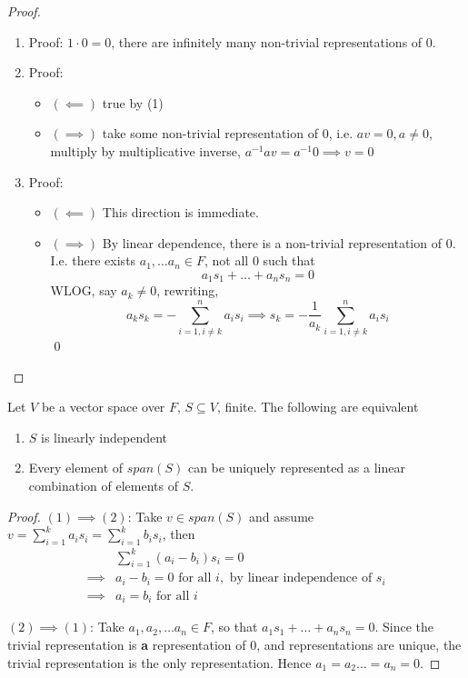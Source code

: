 \begin{proof}
\begin{enumerate}
  \item Proof: $1 \cdot 0 = 0$, there are infinitely many non-trivial representations of 0.
  \item Proof:
  \begin{itemize}
    \item $(\impliedby)$ true by (1)
    \item $(\implies)$ take some non-trivial representation of 0, i.e. $av = 0, a \neq 0$, multiply by multiplicative inverse, $a^{-1}a v = a^{-1}0 \implies v = 0$
  \end{itemize}
  \item Proof:
  \begin{itemize}
    \item $(\impliedby)$ This direction is immediate.
    \item $(\implies)$ By linear dependence, there is a non-trivial representation of 0. I.e. there exists $a_1, \hdots a_n \in F$, not all 0 such that 
    \[
      a_1 s_1 + \hdots + a_n s_n = 0
    \]
    WLOG, say $a_k \neq 0$, rewriting, 
    \[
      a_ks_k = - \sum_{i = 1, i \neq k}^n a_i s_i \implies s_k = - \frac{1}{a_k} \sum_{i = 1, i \neq k}^{n} a_i s_i
    \]
    \qed
  \end{itemize}
\end{enumerate}
\end{proof}

\begin{lemma}
Let $V$ be a vector space over $F$, $S \subseteq V$, finite. The following are equivalent 
\begin{enumerate}
  \item $S$ is linearly independent
  \item Every element of $span(S)$ can be uniquely represented as a linear combination of elements of $S$.
\end{enumerate}
\end{lemma}

\begin{proof}
$(1) \implies (2)$: Take $v \in span(S)$ and assume $v = \sum_{i = 1}^k a_i s_i = \sum_{i = 1}^k b_i s_i$, then 
\begin{align*}
  &\sum_{i = 1}^k (a_i - b_i) s_i = 0 \\
  \implies &a_i - b_i = 0 \text{ for all } i, \text{ by linear independence of } s_i \\
  \implies &a_i = b_i \text{ for all } i
\end{align*}


$(2) \implies (1)$: Take $a_1, a_2, \hdots a_n \in F$, so that $a_1 s_1 + \hdots + a_n s_n = 0$. Since the trivial representation is \textbf{a} representation of $0$, and representations are unique, the trivial representation is the only representation. Hence $a_1 = a_2 \hdots = a_n = 0$.
\end{proof}

\newpage